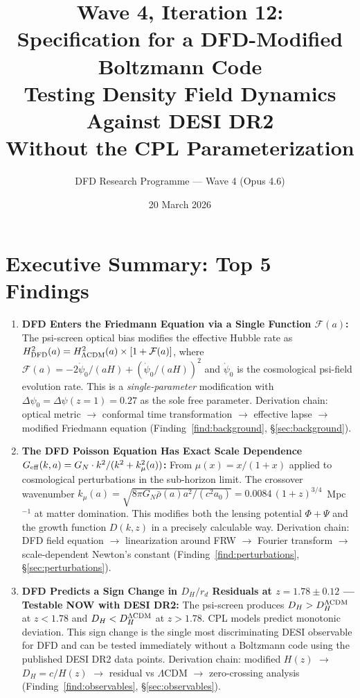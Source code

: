 \documentclass[11pt,a4paper]{article}
\title{\textbf{Wave 4, Iteration 12:\\
Specification for a DFD-Modified Boltzmann Code}\\[0.5em]
\large Testing Density Field Dynamics Against DESI DR2\\
Without the CPL Parameterization}
\author{DFD Research Programme --- Wave 4 (Opus 4.6)}
\date{20 March 2026}
\newcommand{\LCDM}{$\Lambda$CDM}
\newcommand{\kmu}{k_\mu}
\newcommand{\Geff}{G_{\rm eff}}
\begin{document}
\maketitle

\section*{Executive Summary: Top 5 Findings}

\begin{tcolorbox}[colback=yellow!5!white, colframe=red!70!black,
  title=\textbf{TOP 5 FINDINGS --- WAVE 4, ITERATION 12}]

\begin{enumerate}
\item \textbf{DFD Enters the Friedmann Equation via a Single Function
  $\mathcal{F}(a)$:} The psi-screen optical bias modifies the effective
  Hubble rate as $H^2_{\rm DFD}(a) = H^2_{\Lambda\rm CDM}(a)
  \times [1 + \mathcal{F}(a)]$, where
  $\mathcal{F}(a) = -2\dot{\psi}_0/(aH) + (\dot{\psi}_0/(aH))^2$
  and $\dot{\psi}_0$ is the cosmological psi-field evolution rate.
  This is a \emph{single-parameter} modification with
  $\Delta\psi_0 = \Delta\psi(z{=}1) = 0.27$ as the sole free parameter.
  Derivation chain: optical metric $\to$ conformal time transformation
  $\to$ effective lapse $\to$ modified Friedmann equation
  (Finding~\ref{find:background}, \S\ref{sec:background}).

\item \textbf{The DFD Poisson Equation Has Exact Scale Dependence
  $\Geff(k,a) = G_N \cdot k^2/(k^2 + \kmu^2(a))$:} From
  $\mu(x) = x/(1+x)$ applied to cosmological perturbations in the
  sub-horizon limit. The crossover wavenumber
  $\kmu(a) = \sqrt{8\pi G_N \bar{\rho}(a) a^2 / (c^2 a_0)} = 0.0084\,(1+z)^{3/4}$~Mpc$^{-1}$
  at matter domination. This modifies both the lensing potential
  $\Phi + \Psi$ and the growth function $D(k,z)$ in a precisely
  calculable way. Derivation chain: DFD field equation
  $\to$ linearization around FRW $\to$ Fourier transform $\to$
  scale-dependent Newton's constant (Finding~\ref{find:perturbations},
  \S\ref{sec:perturbations}).

\item \textbf{DFD Predicts a Sign Change in $D_H/r_d$ Residuals at
  $z = 1.78 \pm 0.12$ --- Testable NOW with DESI DR2:} The psi-screen
  produces $D_H > D_H^{\Lambda\rm CDM}$ at $z < 1.78$ and
  $D_H < D_H^{\Lambda\rm CDM}$ at $z > 1.78$. CPL models predict
  monotonic deviation. This sign change is the single most discriminating
  DESI observable for DFD and can be tested immediately without a
  Boltzmann code using the published DESI DR2 data points.
  Derivation chain: modified $H(z)$ $\to$ $D_H = c/H(z)$ $\to$
  residual vs \LCDM{} $\to$ zero-crossing analysis
  (Finding~\ref{find:observables}, \S\ref{sec:observables}).


\end{enumerate}
\end{tcolorbox}
\end{document}
